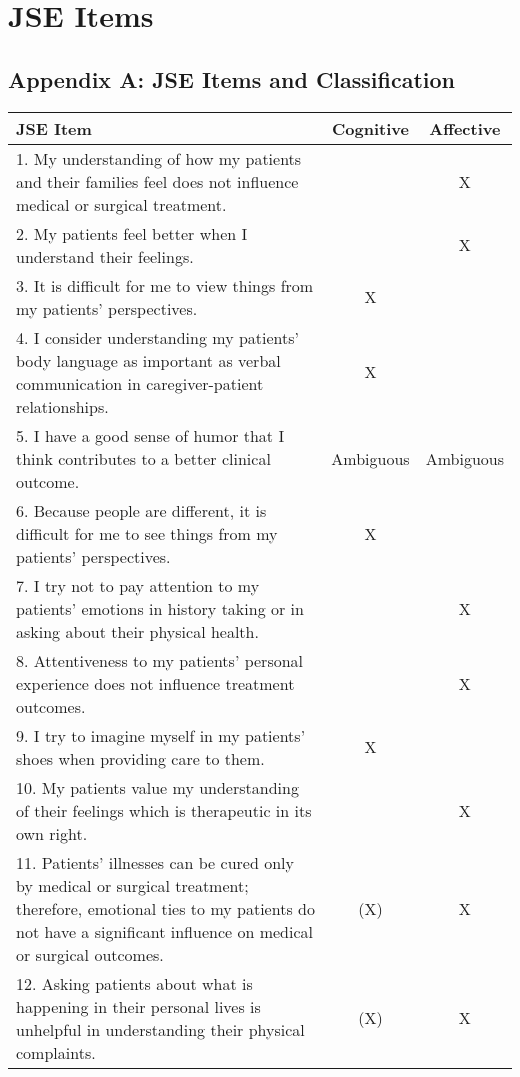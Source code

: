 
\chapter{JSE Items}
\section*{Appendix A: JSE Items and Classification}
\label{app:jse}

\begin{table}[H]
\centering
\begin{tabular}{p{11cm}cc}
\toprule
\textbf{JSE Item} & \textbf{Cognitive} & \textbf{Affective} \\
\midrule
1. My understanding of how my patients and their families feel does not influence medical or surgical treatment. &  & X \\
2. My patients feel better when I understand their feelings. &  & X \\
3. It is difficult for me to view things from my patients’ perspectives. & X & \\
4. I consider understanding my patients’ body language as important as verbal communication in caregiver-patient relationships. & X & \\
5. I have a good sense of humor that I think contributes to a better clinical outcome. & Ambiguous & Ambiguous \\
6. Because people are different, it is difficult for me to see things from my patients’ perspectives. & X & \\
7. I try not to pay attention to my patients’ emotions in history taking or in asking about their physical health. &  & X \\
8. Attentiveness to my patients’ personal experience does not influence treatment outcomes. &  & X \\
9. I try to imagine myself in my patients’ shoes when providing care to them. & X & \\
10. My patients value my understanding of their feelings which is therapeutic in its own right. &  & X \\
11. Patients’ illnesses can be cured only by medical or surgical treatment; therefore, emotional ties to my patients do not have a significant influence on medical or surgical outcomes. & (X) & X \\
12. Asking patients about what is happening in their personal lives is unhelpful in understanding their physical complaints. & (X) & X \\

\end{tabular}
\end{table}
